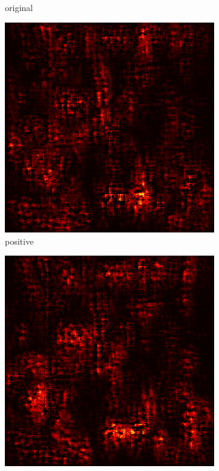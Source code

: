 \documentclass[preprint,12pt]{elsarticle}
\begin{document}
\begin{figure}
\begin{subfigure}{0.14\linewidth}
        \caption{original}
    \end{subfigure}
    \hfill
    \begin{subfigure}{0.14\textwidth}
        \centering
        \includegraphics[width=\linewidth]{../visualizations/examples/imagenette/cnn/positive_saliency_map/4.png}
        \caption{positive}
    \end{subfigure}
    \hfill
    \begin{subfigure}{0.14\textwidth}
        \centering
        \includegraphics[width=\linewidth]{../visualizations/examples/imagenette/cnn/negative_saliency_map/4.png}

\end{subfigure}
\end{figure}
\end{document}
